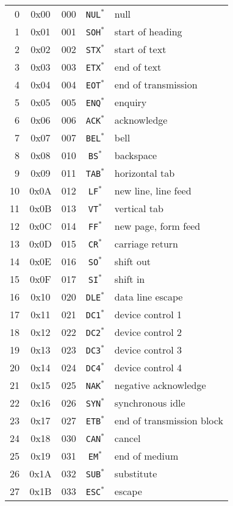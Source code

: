 \begin{supertabular}{r|c|c|c|p{.3\linewidth}}
0 & 0x00 & 000 & \texttt{NUL}$^*$ & null \\
1 & 0x01 & 001 & \texttt{SOH}$^*$ & start of heading \\
2 & 0x02 & 002& \texttt{STX}$^*$ & start of text\\
3 & 0x03 & 003 & \texttt{ETX}$^*$ & end of text\\
4 & 0x04 & 004 & \texttt{EOT}$^*$ & end of transmission\\
5 & 0x05 & 005 & \texttt{ENQ}$^*$ & enquiry\\
6 & 0x06 & 006 & \texttt{ACK}$^*$ & acknowledge\\
7 & 0x07 & 007 & \texttt{BEL}$^*$ & bell\\
8 & 0x08 & 010 & \texttt{BS}$^*$ & backspace\\
9 & 0x09 & 011 & \texttt{TAB}$^*$ & horizontal tab\\
10 & 0x0A & 012 & \texttt{LF}$^*$ & new line, line feed\\
11 & 0x0B & 013 & \texttt{VT}$^*$ & vertical tab\\
12 & 0x0C & 014 & \texttt{FF}$^*$ & new page, form feed\\
13 & 0x0D & 015 & \texttt{CR}$^*$ & carriage return\\
14 & 0x0E & 016 & \texttt{SO}$^*$ & shift out\\
15 & 0x0F & 017 & \texttt{SI}$^*$ & shift in \\
16 & 0x10 & 020 & \texttt{DLE}$^*$ & data line escape\\
17 & 0x11 & 021 & \texttt{DC1}$^*$ & device control 1\\
18 & 0x12 & 022 & \texttt{DC2}$^*$ & device control 2\\
19 & 0x13 & 023 & \texttt{DC3}$^*$ & device control 3\\
20 & 0x14 & 024 & \texttt{DC4}$^*$ & device control 4\\
21 & 0x15 & 025 & \texttt{NAK}$^*$ & negative acknowledge\\
22 & 0x16 & 026 & \texttt{SYN}$^*$ & synchronous idle\\
23 & 0x17 & 027 & \texttt{ETB}$^*$ & end of transmission block\\
24 & 0x18 & 030 & \texttt{CAN}$^*$ & cancel\\
25 & 0x19 & 031 & \texttt{EM}$^*$ & end of medium\\
26 & 0x1A & 032 & \texttt{SUB}$^*$ & substitute\\
27 & 0x1B & 033 & \texttt{ESC}$^*$ & escape\\

\end{supertabular}
